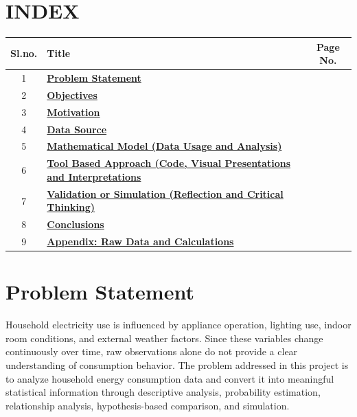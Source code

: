 \documentclass[12pt,a4paper]{article}
\begin{document}
\setcounter{page}{2}
\setcounter{section}{0}

\section*{INDEX}

\vspace{0.5cm}

\begin{center}
\begin{tabular}{|c|p{10cm}|c|}
\hline
\textbf{Sl.no.} & \textbf{Title} & \textbf{Page No.} \\
\hline
1 & \hyperref[sec:problem]{\textbf{Problem Statement}} & \pageref{sec:problem} \\
\hline
2 & \hyperref[sec:objective]{\textbf{Objectives}} & \pageref{sec:objective} \\
\hline
3 & \hyperref[sec:motivation]{\textbf{Motivation}} & \pageref{sec:motivation} \\
\hline
4 & \hyperref[sec:data]{\textbf{Data Source}} & \pageref{sec:data} \\
\hline
5 & \hyperref[sec:model]{\textbf{Mathematical Model (Data Usage and \mbox{Analysis)}}} & \pageref{sec:model} \\
\hline
6 & \hyperref[sec:code]{\textbf{Tool Based Approach (Code, Visual \mbox{Presentations}
and Interpretations}} & \pageref{sec:code} \\
\hline
7 & \hyperref[sec:simulation]{\textbf{Validation or Simulation (Reflection and
Critical Thinking)}} & \pageref{sec:simulation} \\
\hline
8 & \hyperref[sec:conclusion]{\textbf{Conclusions}} & \pageref{sec:conclusion} \\
\hline
9 & \hyperref[sec:appendix]{\textbf{Appendix: Raw Data and Calculations}} & \pageref{sec:appendix} \\
\hline
\end{tabular}
\end{center}

\newpage


\section{Problem Statement}
\label{sec:problem}

Household electricity use is influenced by appliance operation, lighting use, indoor room conditions, and external weather factors. Since these variables change continuously over time, raw observations alone do not provide a clear understanding of consumption behavior. The problem addressed in this project is to analyze household energy consumption data and convert it into meaningful statistical information through descriptive analysis, probability estimation, relationship analysis, hypothesis-based comparison, and simulation.
\end{document}
